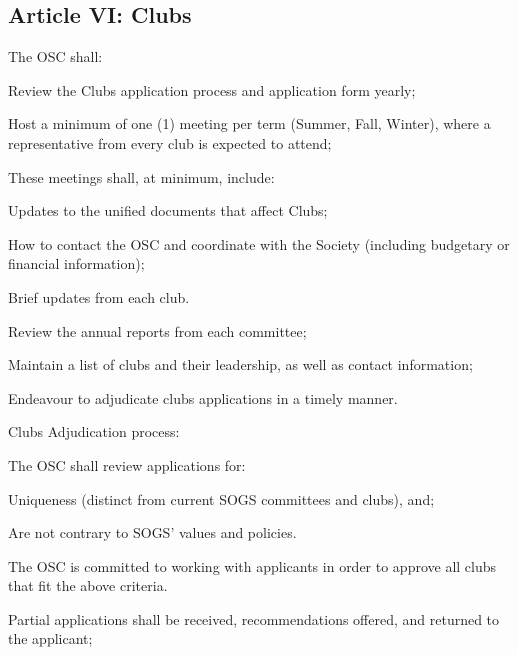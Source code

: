 \subsection{Article VI: Clubs}
\begin{longenum}[ label*=\thesubsection.\arabic*., align=left] 
\item The OSC shall:
	\begin{longenum}[label*=\arabic*., align=left]
	\item Review the Clubs application process and application form yearly;
	\item Host a minimum of one (1) meeting per term (Summer, Fall, Winter), where a representative from every club is expected to attend;
		\begin{longenum}[label*=\arabic*., align=left]
		\item These meetings shall, at minimum, include:
			\begin{longenum}[label*=\arabic*., align=left]
			\item Updates to the unified documents that affect Clubs;
			\item How to contact the OSC and coordinate with the Society (including budgetary or financial information);
			\item Brief updates from each club.
			\end{longenum}
		\end{longenum}
	\item Review the annual reports from each committee;
	\item Maintain a list of clubs and their leadership, as well as contact information;
	\item Endeavour to adjudicate clubs applications in a timely manner.
	\end{longenum}
\item Clubs Adjudication process:
	\begin{longenum}[label*=\arabic*., align=left]
	\item The OSC shall review applications for:
		\begin{longenum}[label*=\arabic*., align=left]
		\item Uniqueness (distinct from current SOGS committees and clubs), and;
		\item Are not contrary to SOGS' values and policies.
		\end{longenum}
	\item The OSC is committed to working with applicants in order to approve all clubs that fit the above criteria.
	\item Partial applications shall be received, recommendations offered, and returned to the applicant;

\end{longenum}
\end{longenum}
